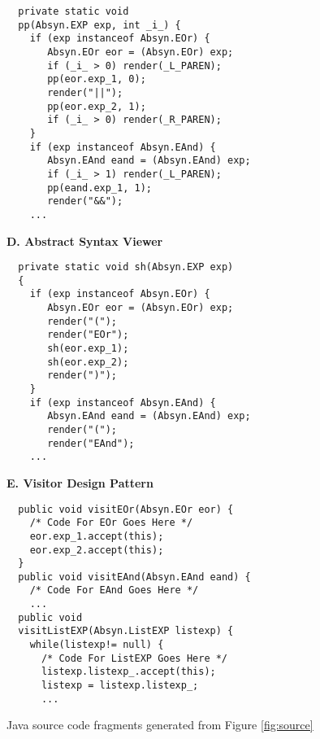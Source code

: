 \begin{figure}
\begin{boxedminipage}[t]{\textwidth}
\begin{minipage}[r]{0.5\textwidth}
\scriptsize
\begin{verbatim}
  private static void
  pp(Absyn.EXP exp, int _i_) {
    if (exp instanceof Absyn.EOr) {
       Absyn.EOr eor = (Absyn.EOr) exp;
       if (_i_ > 0) render(_L_PAREN);
       pp(eor.exp_1, 0);
       render("||");
       pp(eor.exp_2, 1);
       if (_i_ > 0) render(_R_PAREN);
    }
    if (exp instanceof Absyn.EAnd) {
       Absyn.EAnd eand = (Absyn.EAnd) exp;
       if (_i_ > 1) render(_L_PAREN);
       pp(eand.exp_1, 1);
       render("&&");
    ...
\end{verbatim}
\normalsize
\textbf{D. Abstract Syntax Viewer}
\scriptsize
\begin{verbatim}
  private static void sh(Absyn.EXP exp)
  {
    if (exp instanceof Absyn.EOr) {
       Absyn.EOr eor = (Absyn.EOr) exp;
       render("(");
       render("EOr");
       sh(eor.exp_1);
       sh(eor.exp_2);
       render(")");
    }
    if (exp instanceof Absyn.EAnd) {
       Absyn.EAnd eand = (Absyn.EAnd) exp;
       render("(");
       render("EAnd");
    ...
\end{verbatim}
\normalsize

\textbf{E. Visitor Design Pattern}

\scriptsize
\begin{verbatim}
  public void visitEOr(Absyn.EOr eor) {
    /* Code For EOr Goes Here */
    eor.exp_1.accept(this);
    eor.exp_2.accept(this);
  }
  public void visitEAnd(Absyn.EAnd eand) {
    /* Code For EAnd Goes Here */
    ...
  public void
  visitListEXP(Absyn.ListEXP listexp) {
    while(listexp!= null) {
      /* Code For ListEXP Goes Here */
      listexp.listexp_.accept(this);
      listexp = listexp.listexp_;
      ...
\end{verbatim}
\normalsize

\hfill
\end{minipage}
\end{boxedminipage}
\caption{Java source code fragments generated from Figure \ref{fig:source}}
\label{fig:java}
\end{figure}

